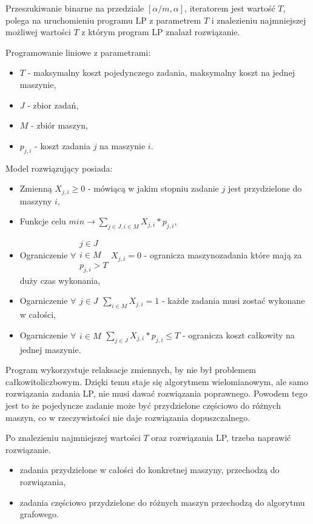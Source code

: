 Przeszukiwanie binarne na przedziale $[\alpha / m, \alpha]$, iteratorem jest wartość $T$,
polega na uruchomieniu programu LP z parametrem $T$ i znalezieniu najmniejszej możliwej wartości
$T$ z którym program LP znalazł rozwiązanie. 

Programowanie liniowe z parametrami:
\begin{itemize}
    \item $T$ - maksymalny koszt pojedynczego zadania, maksymalny koszt na jednej maszynie,
    \item $J$ - zbior zadań,
    \item $M$ - zbiór maszyn,
    \item $p_{j,i}$ - koszt zadania $j$ na maszynie $i$.
\end{itemize}

Model rozwiązujący posiada:
\begin{itemize}
    \item Zmienną $X_{j,i} \geq 0$ - mówiącą w jakim stopniu zadanie $j$ jest przydzielone do maszyny $i$,
    \item Funkcje celu $min \rightarrow \sum_{j \in J, i \in M} X_{j,i} * p_{j,i}$,
    \item Ograniczenie $\forall \substack{j \in J \\ i \in M \\ p_{j,i} > T} X_{j,i} = 0 $ - ogranicza maszynozadania które mają za duży czas wykonania,
    \item Ogarniczenie $\forall \substack{j \in J} \sum_{i \in M} X_{j,i} = 1$ - każde zadania musi zostać wykonane w całości,
    \item Ogarniczenie $\forall \substack{i \in M} \sum_{j \in J} X_{j,i} * p_{j,i} \leq T$ - ogranicza koszt całkowity na jednej maszynie.
\end{itemize}

Program wykorzystuje relaksacje zmiennych, by nie był problemem całkowitoliczbowym. Dzięki temu staje się
algorytmem wielomianowym, ale samo rozwiązania zadania LP, nie musi dawać rozwiązania poprawnego.
Powodem tego jest to że pojedyncze zadanie może być przydzielone częściowo do różnych maszyn, co w rzeczywistości 
nie daje rozwiązania dopuszczalnego. 

Po znalezieniu najmniejszej wartości $T$ oraz rozwiązania LP, trzeba naprawić rozwiązanie.
\begin{itemize}
    \item zadania przydzielone w całości do konkretnej maszyny, przechodzą do rozwiązania,
    \item zadania częściowo przydzielone do różnych maszyn przechodzą do algorytmu grafowego.
\end{itemize}


